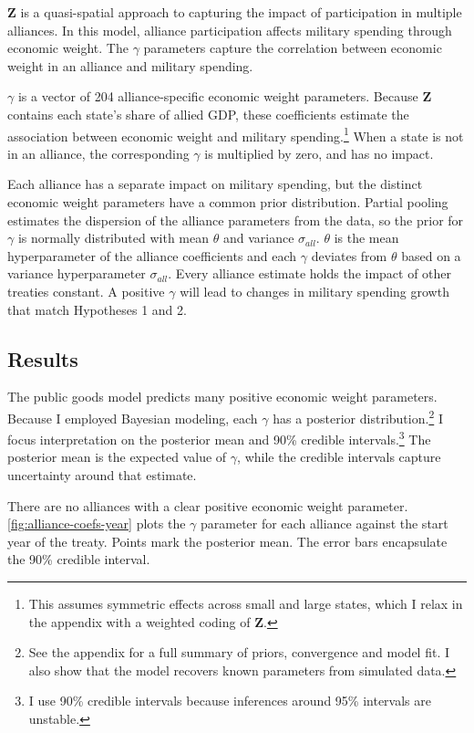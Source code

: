 \documentclass[12pt]{article}
\begin{document}
$\textbf{Z}$ is a quasi-spatial approach to capturing the impact of participation in multiple alliances.
In this model, alliance participation affects military spending through economic weight.  
The $\gamma$ parameters capture the correlation between economic weight in an alliance and military spending. 


$\gamma$ is a vector of 204 alliance-specific economic weight parameters.  
Because \textbf{Z} contains each state's share of allied GDP, these coefficients estimate the association between economic weight and military spending.\footnote{This assumes symmetric effects across small and large states, which I relax in the appendix with a weighted coding of $\textbf{Z}$.} 
When a state is not in an alliance, the corresponding $\gamma$ is multiplied by zero, and has no impact. 


Each alliance has a separate impact on military spending, but the distinct economic weight parameters have a common prior distribution.
Partial pooling estimates the dispersion of the alliance parameters from the data, so the prior for $\gamma$ is normally distributed with mean $\theta$ and variance $\sigma_{all}$. 
$\theta$ is the mean hyperparameter of the alliance coefficients and each $\gamma$ deviates from $\theta$ based on a variance hyperparameter $\sigma_{all}$.
Every alliance estimate holds the impact of other treaties constant. 
A positive $\gamma$ will lead to changes in military spending growth that match Hypotheses 1 and 2. 
    


\subsection{Results} 


The public goods model predicts many positive economic weight parameters. 
Because I employed Bayesian modeling, each $\gamma$ has a posterior distribution.\footnote{See the appendix for a full summary of priors, convergence and model fit. I also show that the model recovers known parameters from simulated data.} 
I focus interpretation on the posterior mean and 90\% credible intervals.\footnote{I use 90\% credible intervals because inferences around 95\% intervals are unstable.}
The posterior mean is the expected value of $\gamma$, while the credible intervals capture uncertainty around that estimate.  


There are no alliances with a clear positive economic weight parameter.
\autoref{fig:alliance-coefs-year} plots the $\gamma$ parameter for each alliance against the start year of the treaty.
Points mark the posterior mean. 
The error bars encapsulate the 90\% credible interval.
\end{document}
